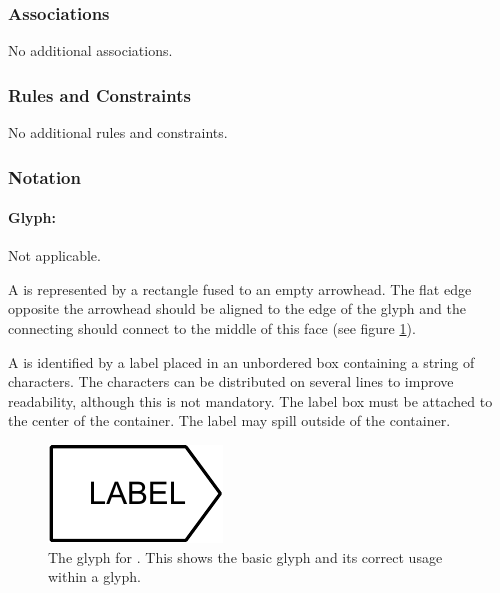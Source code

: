\subsubsection{Associations}

No additional associations.

\subsubsection{Rules and Constraints}

No additional rules and constraints.

\subsubsection{Notation}

\paragraph{Glyph: }

\begin{glyphDescription}

\glyphSboTerm Not applicable.

\glyphContainer A  is represented by a rectangle fused to
an empty arrowhead.  The
flat edge opposite the arrowhead should be aligned to the edge of the
 glyph and the connecting should connect to the middle
of this face (see figure \ref{fig:techref:submapterminal}).

\glyphLabel A  is identified by a label placed in an
unbordered box containing a string of characters.  The characters can
be distributed on several lines to improve readability, although this
is not mandatory.  The label box must be attached to the center of the
container. The label may spill outside of the container.

\end{glyphDescription}

\begin{figure}[htb]
  \centering
  \includegraphics[scale = 0.3]{images/submapterminal}
  \caption{The \PD glyph for . This shows the
    basic glyph and its correct usage within a  glyph.}
  \label{fig:techref:submapterminal}
\end{figure}

